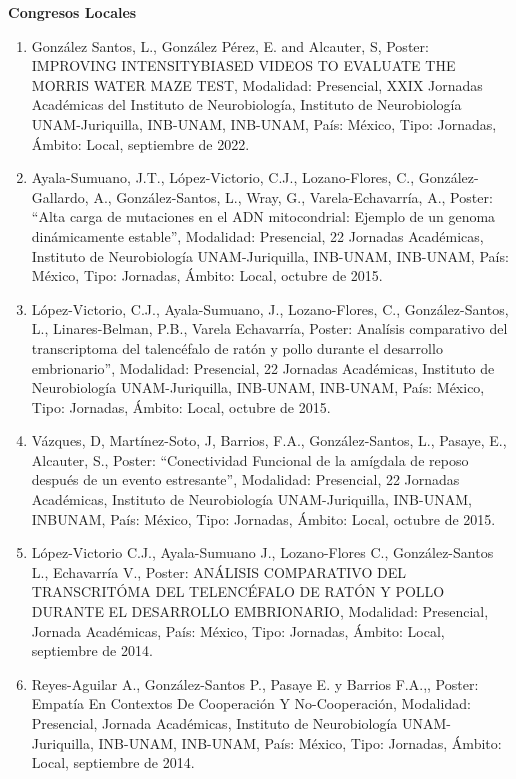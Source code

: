{\large \textbf{Congresos Locales}}

\hrulefill

\begin{enumerate}

\item González Santos, L., González Pérez, E. and Alcauter, S, Poster: IMPROVING INTENSITYBIASED VIDEOS TO 
EVALUATE 
THE MORRIS WATER MAZE TEST, Modalidad: Presencial, XXIX Jornadas Académicas del Instituto de Neurobiología, 
Instituto de Neurobiología UNAM-Juriquilla, INB-UNAM, INB-UNAM, País: México, Tipo: Jornadas, Ámbito: Local, 
septiembre de 2022.

\item Ayala-Sumuano, J.T., López-Victorio, C.J., Lozano-Flores, C., González-Gallardo, A., González-Santos, 
L., 
Wray, G., Varela-Echavarría, A., Poster: “Alta carga de mutaciones en el ADN mitocondrial: Ejemplo de un 
genoma dinámicamente estable”, Modalidad: Presencial, 22 Jornadas Académicas, Instituto de Neurobiología 
UNAM-Juriquilla, INB-UNAM, INB-UNAM, País: México, Tipo: Jornadas, Ámbito: Local, octubre de 2015.

\item López-Victorio, C.J., Ayala-Sumuano, J., Lozano-Flores, C., González-Santos, L., Linares-Belman, P.B., 
Varela 
Echavarría, Poster: Analísis comparativo del transcriptoma del talencéfalo de ratón y pollo durante el 
desarrollo embrionario”, Modalidad: Presencial, 22 Jornadas Académicas, Instituto de Neurobiología 
UNAM-Juriquilla, INB-UNAM, INB-UNAM, País: México, Tipo: Jornadas, Ámbito: Local, octubre de 2015.

\item Vázques, D, Martínez-Soto, J, Barrios, F.A., González-Santos, L., Pasaye, E., Alcauter, S., Poster: 
“Conectividad Funcional de la amígdala de reposo después de un evento estresante”, Modalidad: Presencial, 22 
Jornadas Académicas, Instituto de Neurobiología UNAM-Juriquilla, INB-UNAM, INBUNAM, País: México, Tipo: 
Jornadas, Ámbito: Local, octubre de 2015.

\item López-Victorio C.J., Ayala-Sumuano J., Lozano-Flores C., González-Santos L., Echavarría V., Poster: 
ANÁLISIS 
COMPARATIVO DEL TRANSCRITÓMA DEL TELENCÉFALO DE RATÓN Y POLLO DURANTE EL DESARROLLO EMBRIONARIO, Modalidad: 
Presencial, Jornada Académicas, País: México, Tipo: Jornadas, Ámbito: Local, septiembre de 2014.

\item Reyes-Aguilar A., González-Santos P., Pasaye E. y Barrios F.A.,, Poster: Empatía En Contextos De 
Cooperación Y 
No-Cooperación, Modalidad: Presencial, Jornada Académicas, Instituto de Neurobiología UNAM-Juriquilla, 
INB-UNAM, INB-UNAM, País: México, Tipo: Jornadas, Ámbito: Local, septiembre de 2014.


\end{enumerate}

